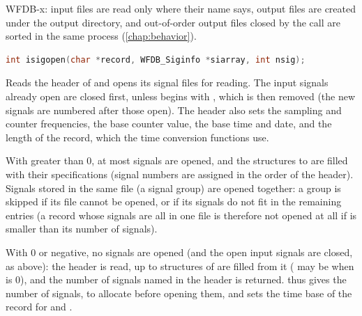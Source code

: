 WFDB-x: input files are read only where their name says, output files are
created under the output directory, and out-of-order output files closed by
the call are sorted in the same process (\cref{chap:behavior}).

\begin{lstlisting}[language=C,style=signature]
int isigopen(char *record, WFDB_Siginfo *siarray, int nsig);
\end{lstlisting}
Reads the header of  and opens its signal files for reading.
The input signals already open are closed first, unless  begins
with \code{+}, which is then removed (the new signals are numbered after
those open). The header also sets the sampling and counter frequencies, the
base counter value, the base time and date, and the length of the record,
which the time conversion functions use.

With  greater than 0, at most  signals are opened, and
the structures  to  are filled with their
specifications (signal numbers are assigned in the order of the header).
Signals stored in the same file (a signal group) are opened together: a
group is skipped if its file cannot be opened, or if its signals do not fit
in the remaining entries (a record whose signals are all in one file is
therefore not opened at all if  is smaller than its number of
signals).

With  0 or negative, no signals are opened (and the open input
signals are closed, as above): the header is read, up to 
structures of  are filled from it ( may be
 when  is 0), and the number of signals named in the
header is returned.  thus gives the number of
signals, to allocate  before opening them, and sets the time
base of the record for  and .

